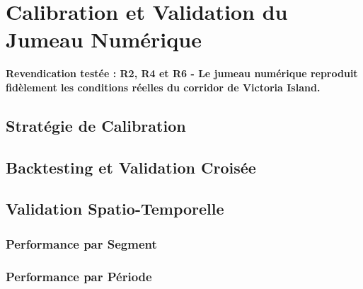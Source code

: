\section{Calibration et Validation du Jumeau Numérique}
\label{sec:validation_jumeau_numerique}

\textbf{Revendication testée : R2, R4 et R6 - Le jumeau numérique reproduit fidèlement les conditions réelles du corridor de Victoria Island.}

\subsection{Stratégie de Calibration}
\label{subsec:strategie_calibration}

\subsection{Backtesting et Validation Croisée}
\label{subsec:backtesting}

\subsection{Validation Spatio-Temporelle}
\label{subsec:validation_spatiotemporelle}

\subsubsection{Performance par Segment}

\subsubsection{Performance par Période}

